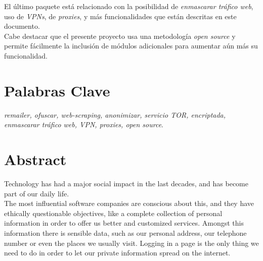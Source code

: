 El último paquete está relacionado con la posibilidad de \textit{enmascarar tráfico web}, uso de \textit{VPNs}, de \textit{proxies}, y más funcionalidades que están descritas en este documento.\\
Cabe destacar que el presente proyecto usa una metodología \textit{open source} y permite fácilmente la inclusión de módulos adicionales para aumentar aún más su funcionalidad.\\

\section*{Palabras Clave}
\textit{remailer, ofuscar, web-scraping, anonimizar, servicio TOR, encriptada, enmascarar tráfico web, VPN, proxies, open source}.
\newpage

\section*{Abstract}
Technology has had a major social impact in the last decades, and has become part of our daily life.\\
The most influential software companies are conscious about this, and they have ethically questionable objectives, like a complete collection of personal information in order to offer us better and customized services. Amongst this information there is sensible data, such as our personal address, our telephone number or even the places we usually visit. Logging in a page is the only thing we need to do in order to let our private information spread on the internet.


